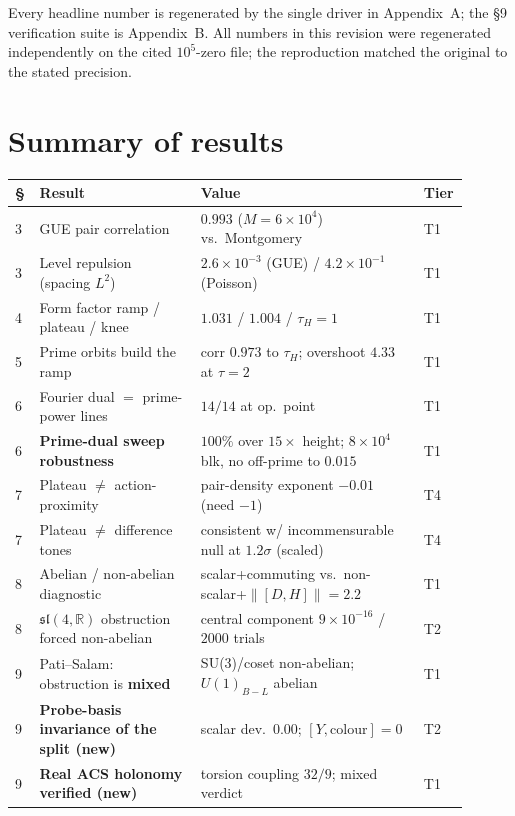 \documentclass[11pt]{article}
\newcommand{\sltwo}{\mathfrak{sl}(4,\mathbb{R})}
\begin{document}
\noindent Every headline number is regenerated by the single driver in Appendix~A; the \S9 verification suite is Appendix~B. All numbers in this revision were regenerated independently on the cited $10^5$-zero file; the reproduction matched the original to the stated precision.

\section{Summary of results}

\begin{center}
\renewcommand{\arraystretch}{1.15}
\begin{longtable}{@{}p{0.04\linewidth}p{0.34\linewidth}p{0.47\linewidth}p{0.05\linewidth}@{}}
\toprule
\S & Result & Value & Tier \\
\midrule
3 & GUE pair correlation & $0.993$ ($M{=}6{\times}10^4$) vs.\ Montgomery & T1 \\
3 & Level repulsion (spacing $L^2$) & $2.6\times10^{-3}$ (GUE) / $4.2\times10^{-1}$ (Poisson) & T1 \\
4 & Form factor ramp / plateau / knee & $1.031$ / $1.004$ / $\tau_H=1$ & T1 \\
5 & Prime orbits build the ramp & corr $0.973$ to $\tau_H$; overshoot $4.33$ at $\tau=2$ & T1 \\
6 & Fourier dual $=$ prime-power lines & $14/14$ at op.\ point & T1 \\
6 & \textbf{Prime-dual sweep robustness} & $100\%$ over $15\times$ height; $8{\times}10^4$ blk, no off-prime to $0.015$ & T1 \\
7 & Plateau $\neq$ action-proximity & pair-density exponent $-0.01$ (need $-1$) & T4 \\
7 & Plateau $\neq$ difference tones & consistent w/ incommensurable null at $1.2\sigma$ (scaled) & T4 \\
8 & Abelian / non-abelian diagnostic & scalar+commuting vs.\ non-scalar+$\|[D,H]\|{=}2.2$ & T1 \\
8 & $\sltwo$ obstruction forced non-abelian & central component $9\times10^{-16}$ / $2000$ trials & T2 \\
9 & Pati--Salam: obstruction is \textbf{mixed} & SU(3)/coset non-abelian; $U(1)_{B-L}$ abelian & T1 \\
9 & \textbf{Probe-basis invariance of the split (new)} & scalar dev.\ $0.00$; $[Y,\mathrm{colour}]=0$ & T2 \\
9 & \textbf{Real ACS holonomy verified (new)} & torsion coupling $32/9$; mixed verdict & T1 \\

\end{longtable}
\end{center}
\end{document}
